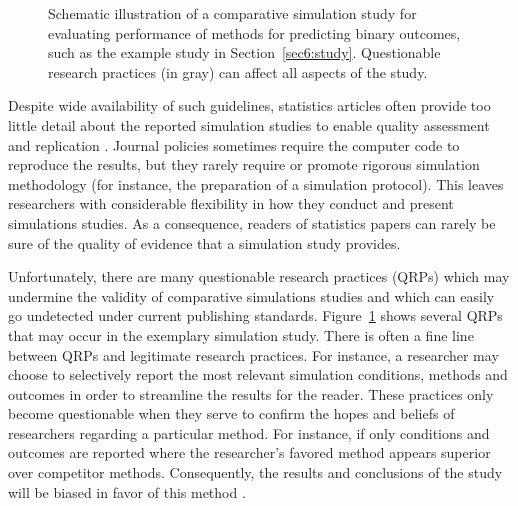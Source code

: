 \begin{figure}[!tb]
{
}
\caption{Schematic illustration of a comparative simulation study for evaluating
  performance of methods for predicting binary outcomes, such as the example
  study in Section~\ref{sec6:study}. Questionable research practices (in gray)
  can affect all aspects of the study.}
\label{fig6:diagram}
\end{figure}

Despite wide availability of such guidelines, statistics articles often provide
too little detail about the reported simulation studies to enable quality
assessment and replication \citep[see the literature reviews in][]{Burton2006,
  Morris2019}. Journal policies sometimes require the computer code to reproduce
the results, but they rarely require or promote rigorous simulation methodology
(for instance, the preparation of a simulation protocol). This leaves
researchers with considerable flexibility in how they conduct and present
simulations studies. As a consequence, readers of statistics papers can rarely
be sure of the quality of evidence that a simulation study provides.

Unfortunately, there are many questionable research practices (QRPs) which may
undermine the validity of comparative simulations studies and which can easily
go undetected under current publishing standards. Figure~\ref{fig6:diagram} shows
several QRPs that may occur in the exemplary simulation study. There is often a
fine line between QRPs and legitimate research practices. For instance, a
researcher may choose to selectively report the most relevant simulation
conditions, methods and outcomes in order to streamline the results for the
reader. These practices only become questionable when they serve to confirm the
hopes and beliefs of researchers regarding a particular method. For instance, if
only conditions and outcomes are reported where the researcher's favored method
appears superior over competitor methods. Consequently, the results and
conclusions of the study will be biased in favor of this method
\citep{Niessl2021}.

